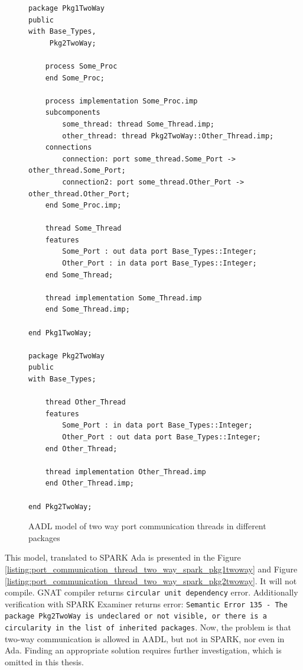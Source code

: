 \begin{figure}[ht]
\singlespacing
\begin{lstlisting}[language=aadl, frame=single, gobble=0]
package Pkg1TwoWay
public
with Base_Types, 
     Pkg2TwoWay;

	process Some_Proc
	end Some_Proc;	

	process implementation Some_Proc.imp
	subcomponents
		some_thread: thread Some_Thread.imp;
		other_thread: thread Pkg2TwoWay::Other_Thread.imp;
	connections
		connection: port some_thread.Some_Port -> other_thread.Some_Port;
		connection2: port some_thread.Other_Port -> other_thread.Other_Port;
	end Some_Proc.imp;

	thread Some_Thread
	features
		Some_Port : out data port Base_Types::Integer;
		Other_Port : in data port Base_Types::Integer;
	end Some_Thread;

	thread implementation Some_Thread.imp
	end Some_Thread.imp;	

end Pkg1TwoWay;

package Pkg2TwoWay
public
with Base_Types;

	thread Other_Thread
	features
		Some_Port : in data port Base_Types::Integer;
		Other_Port : out data port Base_Types::Integer;
	end Other_Thread;

	thread implementation Other_Thread.imp
	end Other_Thread.imp;

end Pkg2TwoWay;
\end{lstlisting} 
\doublespacing
\caption{AADL model of two way port communication threads in different packages}
\label{listing:port_communication_thread_two_way}
\end{figure}

This model, translated to SPARK Ada is presented in the Figure \ref{listing:port_communication_thread_two_way_spark_pkg1twoway} and Figure \ref{listing:port_communication_thread_two_way_spark_pkg2twoway}. It will not compile. GNAT compiler returns \lstinline{circular unit dependency} error. Additionally verification with SPARK Examiner returns error: \lstinline{Semantic Error 135 - The package Pkg2TwoWay is undeclared or not visible, or there is a circularity in the list of inherited packages}. Now, the problem is that two-way communication is allowed in AADL, but not in SPARK, nor even in Ada. Finding an appropriate solution requires further investigation, which is omitted in this thesis.

